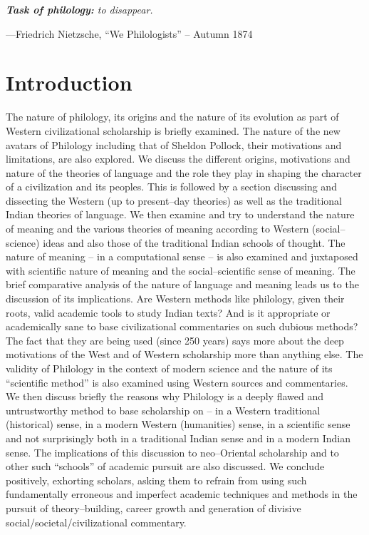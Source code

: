 \textit{\textbf{Task of philology:} to disappear.}

—Friedrich Nietzsche, “We Philologists” – Autumn 1874


\section*{Introduction}

The nature of philology, its origins and the nature of its evolution as part of Western civilizational scholarship is briefly examined. The nature of the new avatars of Philology including that of Sheldon Pollock, their motivations and limitations, are also explored. We discuss the different origins, motivations and nature of the theories of language and the role they play in shaping the character of a civilization and its peoples. This is followed by a section discussing and dissecting the Western (up to present–day theories) as well as the traditional Indian theories of language. We then examine and try to understand the nature of meaning and the various theories of meaning according to Western (social–science) ideas and also those of the traditional Indian schools of thought. The nature of meaning – in a computational sense – is also examined and juxtaposed with scientific nature of meaning and the social–scientific sense of meaning. The brief comparative analysis of the nature of language and meaning leads us to the discussion of its implications. Are Western methods like philology, given their roots, valid academic tools to study Indian texts? And is it appropriate or academically sane to base civilizational commentaries on such dubious methods? The fact that they are being used (since 250 years) says more about the deep motivations of the West and of Western scholarship more than anything else. The validity of Philology in the context of modern science and the nature of its “scientific method” is also examined using Western sources and commentaries. We then discuss briefly the reasons why Philology is a deeply flawed and untrustworthy method to base scholarship on – in a Western traditional (historical) sense, in a modern Western (humanities) sense, in a scientific sense and not surprisingly both in a traditional Indian sense and in a modern Indian sense. The implications of this discussion to neo–Oriental scholarship and to other such “schools” of academic pursuit are also discussed. We conclude positively, exhorting scholars, asking them to refrain from using such fundamentally erroneous and imperfect academic techniques and methods in the pursuit of theory–building, career growth and generation of divisive social/societal/civilizational commentary.


